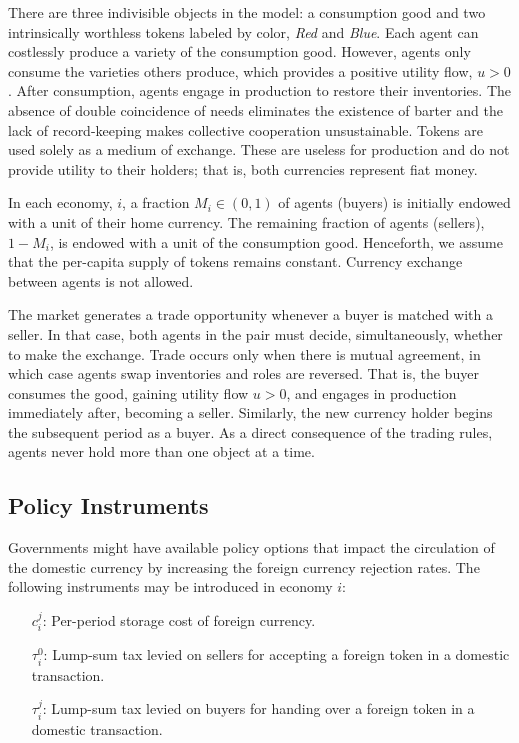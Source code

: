 There are three indivisible objects in the model: a consumption good and two intrinsically worthless tokens labeled by color, \textit{Red} and \textit{Blue}. Each agent can costlessly produce a variety of the consumption good. However, agents only consume the varieties others produce, which provides a positive utility flow, $u>0$. After consumption, agents engage in production to restore their inventories. The absence of double coincidence of needs eliminates the existence of barter and the lack of record-keeping makes collective cooperation unsustainable. Tokens are used solely as a medium of exchange. These are useless for production and do not provide utility to their holders; that is, both currencies represent fiat money.


In each economy, $i$, a fraction $M_i \in (0,1)$ of agents (buyers) is initially endowed with a unit of their home currency. The remaining fraction of agents (sellers), $1-M_i$, is endowed with a unit of the consumption good. Henceforth, we assume that the per-capita supply of tokens remains constant. Currency exchange between agents is not allowed.


The market generates a trade opportunity whenever a buyer is matched with a seller. In that case, both agents in the pair must decide, simultaneously, whether to make the exchange. Trade occurs only when there is mutual agreement, in which case agents swap inventories and roles are reversed. That is, the buyer consumes the good, gaining utility flow $u>0$, and engages in production immediately after, becoming a seller. Similarly, the new currency holder begins the subsequent period as a buyer. As a direct consequence of the trading rules, agents never hold more than one object at a time.

\subsection{Policy Instruments\label{PolicyInstruments}}

Governments might have available policy options that impact the circulation of the domestic currency by increasing the foreign currency rejection rates. The following instruments may be introduced in economy $i$:
\begin{itemize}
    \item[$c^j_i$:] Per-period storage cost of foreign currency.
    \item[$\tau^0_i$:] Lump-sum tax levied on sellers for accepting a foreign token in a domestic transaction.
    \item[$\tau^j_i$:] Lump-sum tax levied on buyers for handing over a foreign token in a domestic transaction.
\end{itemize}

